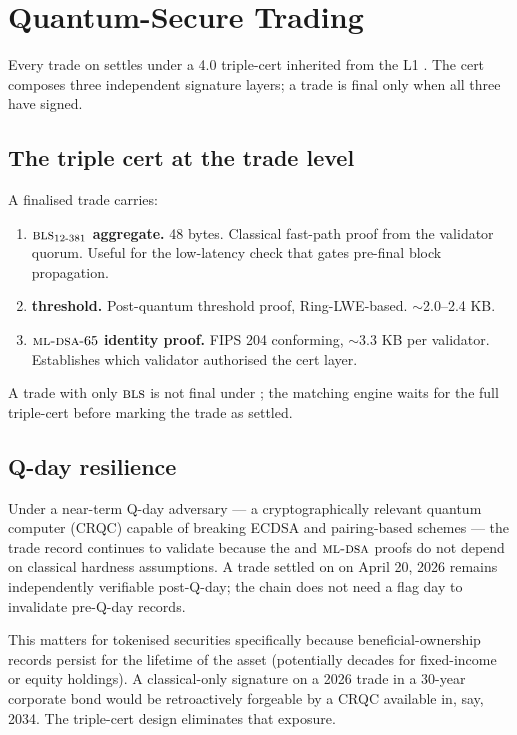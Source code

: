 \section{Quantum-Secure Trading}
\label{sec:quantum-secure}

Every trade on \Zoo{} \DEX{} settles under a \Quasar{} 4.0 triple-cert
inherited from the \Lux{} L1 \cite{lp-020}. The cert composes three
independent signature layers; a trade is final only when all three
have signed.

\subsection{The triple cert at the trade level}

A finalised trade carries:

\begin{enumerate}[leftmargin=1.4em]
  \item \textbf{$\textsc{bls}{}_{12\text{-}381}$ aggregate.} 48 bytes.
        Classical fast-path proof from the \Lux{} validator quorum.
        Useful for the low-latency check that gates pre-final block
        propagation.
  \item \textbf{\Ringtail{} threshold.} Post-quantum threshold
        proof, Ring-LWE-based. $\sim$2.0--2.4 KB.
  \item \textbf{$\textsc{ml-dsa}{}\text{-}65$ identity proof.} FIPS 204
        conforming, $\sim$3.3 KB per validator. Establishes which
        validator authorised the cert layer.
\end{enumerate}

A trade with only $\textsc{bls}{}$ is not final under \Zoo{} \DEX{}; the
matching engine waits for the full triple-cert before marking the
trade as settled.

\subsection{Q-day resilience}

Under a near-term Q-day adversary --- a cryptographically relevant
quantum computer (CRQC) capable of breaking ECDSA and pairing-based
schemes --- the trade record continues to validate because the
\Ringtail{} and $\textsc{ml-dsa}{}$ proofs do not depend on classical hardness
assumptions. A trade settled on \Zoo{} \DEX{} on April 20, 2026
remains independently verifiable post-Q-day; the chain does not
need a flag day to invalidate pre-Q-day records.

This matters for tokenised securities specifically because
beneficial-ownership records persist for the lifetime of the asset
(potentially decades for fixed-income or equity holdings). A
classical-only signature on a 2026 trade in a 30-year corporate
bond would be retroactively forgeable by a CRQC available in, say,
2034. The triple-cert design eliminates that exposure.

